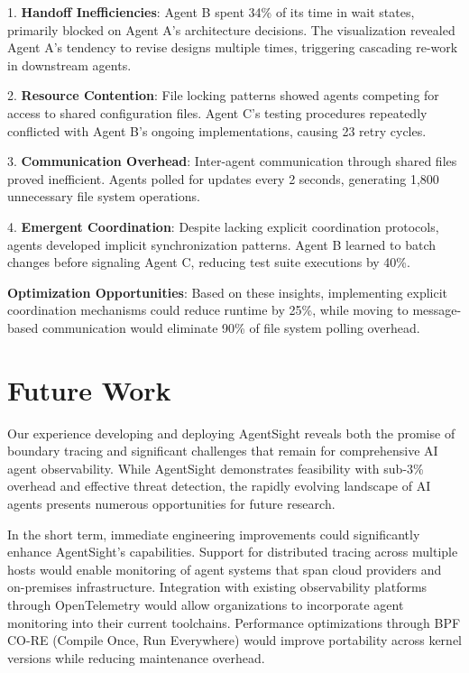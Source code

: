 1. \textbf{Handoff Inefficiencies}: Agent B spent 34\% of its time in wait states, primarily blocked on Agent A's architecture decisions. The visualization revealed Agent A's tendency to revise designs multiple times, triggering cascading re-work in downstream agents.

2. \textbf{Resource Contention}: File locking patterns showed agents competing for access to shared configuration files. Agent C's testing procedures repeatedly conflicted with Agent B's ongoing implementations, causing 23 retry cycles.

3. \textbf{Communication Overhead}: Inter-agent communication through shared files proved inefficient. Agents polled for updates every 2 seconds, generating 1,800 unnecessary file system operations.

4. \textbf{Emergent Coordination}: Despite lacking explicit coordination protocols, agents developed implicit synchronization patterns. Agent B learned to batch changes before signaling Agent C, reducing test suite executions by 40\%.

\textbf{Optimization Opportunities}: Based on these insights, implementing explicit coordination mechanisms could reduce runtime by 25\%, while moving to message-based communication would eliminate 90\% of file system polling overhead.


\section{Future Work}

Our experience developing and deploying AgentSight reveals both the promise of boundary tracing and significant challenges that remain for comprehensive AI agent observability. While AgentSight demonstrates feasibility with sub-3\% overhead and effective threat detection, the rapidly evolving landscape of AI agents presents numerous opportunities for future research.

In the short term, immediate engineering improvements could significantly enhance AgentSight's capabilities. Support for distributed tracing across multiple hosts would enable monitoring of agent systems that span cloud providers and on-premises infrastructure. Integration with existing observability platforms through OpenTelemetry would allow organizations to incorporate agent monitoring into their current toolchains. Performance optimizations through BPF CO-RE (Compile Once, Run Everywhere) would improve portability across kernel versions while reducing maintenance overhead.

